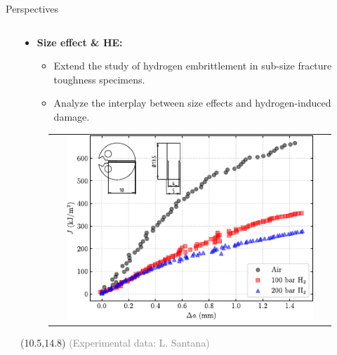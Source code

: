 \documentclass[9pt]{beamer}
\begin{document}
\begin{frame}{Perspectives}
\begin{columns}
\begin{column}{0.5\textwidth}
    	\end{column}
    		

        \begin{column}{0.5\textwidth}
        \begin{itemize}
        	\item \textbf{Size effect \& HE:}
        	\vspace{0.15cm}
        	\begin{itemize}
        		\item Extend the study of hydrogen embrittlement in sub-size fracture toughness specimens.
        		\vspace{0.15cm}
        		\item Analyze the interplay between size effects and hydrogen-induced damage.
        	\end{itemize} 
        \end{itemize}
        \vspace{0.2cm}
        \begin{figure}
        		\begin{tabular}{c}
            		\includegraphics[width=0.9\textwidth]{Images/Jda_H2.pdf} \\
        		\end{tabular}
    		\end{figure}
      
    \begin{textblock}{6}(10.5,14.8)
        \textcolor{gray}{\scriptsize (Experimental data: L. Santana)}
   	\end{textblock}      
      
        \end{column}

    \end{columns}

\end{frame}
\end{document}
